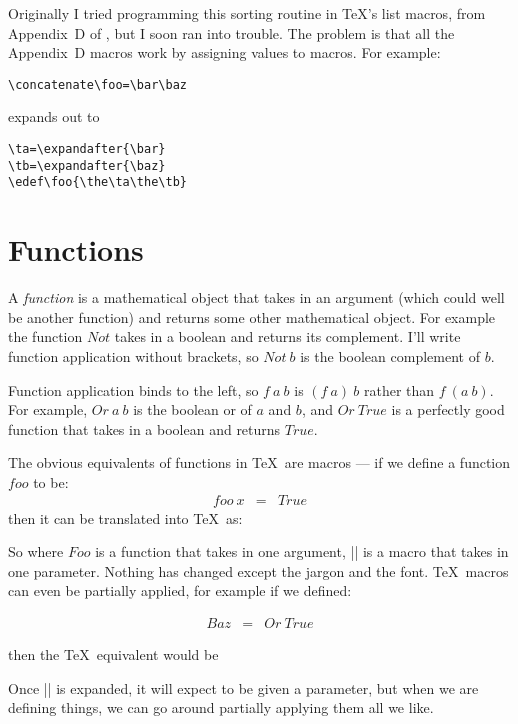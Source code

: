 Originally I tried programming this sorting routine in \TeX's
list macros, from Appendix~D of \TB, but I soon ran into trouble.
The problem is that all the Appendix~D macros work by assigning
values to macros.  For example:
\begin{verbatim}
\concatenate\foo=\bar\baz
\end{verbatim}
expands out to
\begin{verbatim}
\ta=\expandafter{\bar}
\tb=\expandafter{\baz}
\edef\foo{\the\ta\the\tb}
\end{verbatim}
\section{Functions}
\normalsize

A {\em function\/ } is a mathematical object that takes in an argument
(which could well be another function) and returns some other mathematical
object.  For example the function $Not$ takes in a boolean and returns
its complement.  I'll write function application without brackets,
so $Not~b$ is the boolean complement of $b$.  

Function application
binds to the left, so $f~a~b$ is $(f~a)~b$ rather than $f~(a~b)$.
For example, $Or~a~b$ is the boolean or of $a$ and $b$, and
$Or~True$ is a perfectly good function that takes in a boolean
and returns $True$.

The obvious equivalents of functions in \TeX\ are macros ---
if we define a function $foo$ to be:
\begin{eqnarray*}
   foo~x  &  =  &  True
\end{eqnarray*}
then it can be translated into \TeX\ as:

\begin{teX}
\def\Foo#1{\True}
\end{teX}



So where $Foo$ is a function that takes in one argument, |\Foo|
is a macro that takes in one parameter.  Nothing has changed except
the jargon and the font.  \TeX\ macros can even be partially applied,
for example if we defined:

\begin{eqnarray*}
   Baz  &  =  &  Or~True
\end{eqnarray*}

then the \TeX\ equivalent would be

\begin{teX}
\def\Baz{\Or\True}
\end{teX}
Once |\Baz| is expanded, it will expect to be given a parameter,
but when we are defining things, we can go around partially applying
them all we like.


